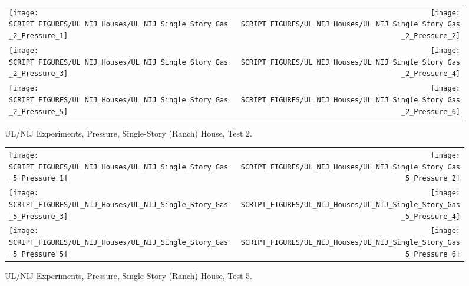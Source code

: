 \begin{figure}[p]
\begin{tabular*}{\textwidth}{l@{\extracolsep{\fill}}r}
\texttt{[image: SCRIPT\_FIGURES/UL\_NIJ\_Houses/UL\_NIJ\_Single\_Story\_Gas\_2\_Pressure\_1]} &
\texttt{[image: SCRIPT\_FIGURES/UL\_NIJ\_Houses/UL\_NIJ\_Single\_Story\_Gas\_2\_Pressure\_2]} \\
\texttt{[image: SCRIPT\_FIGURES/UL\_NIJ\_Houses/UL\_NIJ\_Single\_Story\_Gas\_2\_Pressure\_3]} &
\texttt{[image: SCRIPT\_FIGURES/UL\_NIJ\_Houses/UL\_NIJ\_Single\_Story\_Gas\_2\_Pressure\_4]} \\
\texttt{[image: SCRIPT\_FIGURES/UL\_NIJ\_Houses/UL\_NIJ\_Single\_Story\_Gas\_2\_Pressure\_5]} &
\texttt{[image: SCRIPT\_FIGURES/UL\_NIJ\_Houses/UL\_NIJ\_Single\_Story\_Gas\_2\_Pressure\_6]} \\
\end{tabular*}
\caption[UL/NIJ Experiments, Pressure, Single-Story (Ranch) House, Test 2]{UL/NIJ Experiments, Pressure, Single-Story (Ranch) House, Test 2.}
\label{UL_NIJ_Pres_Ranch_2}
\end{figure}

\begin{figure}[p]
\begin{tabular*}{\textwidth}{l@{\extracolsep{\fill}}r}
\texttt{[image: SCRIPT\_FIGURES/UL\_NIJ\_Houses/UL\_NIJ\_Single\_Story\_Gas\_5\_Pressure\_1]} &
\texttt{[image: SCRIPT\_FIGURES/UL\_NIJ\_Houses/UL\_NIJ\_Single\_Story\_Gas\_5\_Pressure\_2]} \\
\texttt{[image: SCRIPT\_FIGURES/UL\_NIJ\_Houses/UL\_NIJ\_Single\_Story\_Gas\_5\_Pressure\_3]} &
\texttt{[image: SCRIPT\_FIGURES/UL\_NIJ\_Houses/UL\_NIJ\_Single\_Story\_Gas\_5\_Pressure\_4]} \\
\texttt{[image: SCRIPT\_FIGURES/UL\_NIJ\_Houses/UL\_NIJ\_Single\_Story\_Gas\_5\_Pressure\_5]} &
\texttt{[image: SCRIPT\_FIGURES/UL\_NIJ\_Houses/UL\_NIJ\_Single\_Story\_Gas\_5\_Pressure\_6]} \\
\end{tabular*}
\caption[UL/NIJ Experiments, Pressure, Single-Story (Ranch) House, Test 5]{UL/NIJ Experiments, Pressure, Single-Story (Ranch) House, Test 5.}
\label{UL_NIJ_Pres_Ranch_5}
\end{figure}

